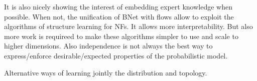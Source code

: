 It is also nicely showing the interest of embedding expert knowledge when possible. When not, the unification of BNet with flows allow to exploit the algorithms of structure learning for NFs. It allows more interpretability.
But also more work is requireed to make these algorithms simpler to use and scale to higher dimensions. Also independence is not always the best way to express/enforce desirable/expected properties of the probabilistic model.

Alternative ways of learning jointly the distribution and topology.
